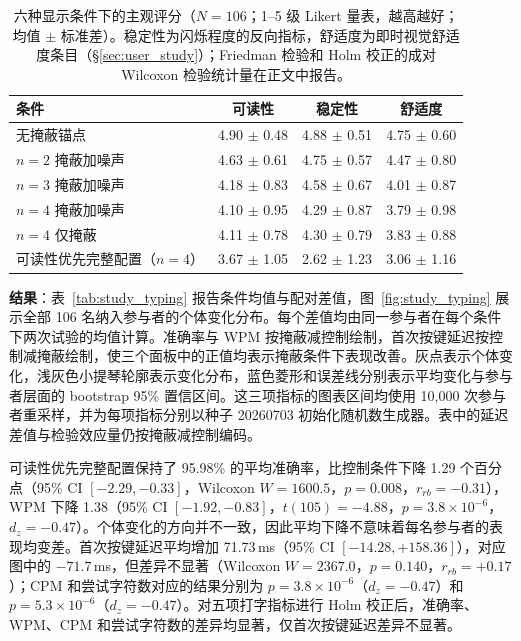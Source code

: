 \documentclass{ieeeaccess}
\begin{document}
{\begin{table}[!t]
\caption{六种显示条件下的主观评分（$N=106$；1--5 级 Likert 量表，越高越好；均值 $\pm$ 标准差）。稳定性为闪烁程度的反向指标，舒适度为即时视觉舒适度条目（\S\ref{sec:user_study}）；Friedman 检验和 Holm 校正的成对 Wilcoxon 检验统计量在正文中报告。}
\label{tab:study_ratings}
\centering
\footnotesize
\setlength{\tabcolsep}{4pt}
\begin{tabular}{lccc}
\toprule
条件 & 可读性 & 稳定性 & 舒适度 \\
\midrule
无掩蔽锚点 & 4.90 $\pm$ 0.48 & 4.88 $\pm$ 0.51 & 4.75 $\pm$ 0.60 \\
$n{=}2$ 掩蔽加噪声 & 4.63 $\pm$ 0.61 & 4.75 $\pm$ 0.57 & 4.47 $\pm$ 0.80 \\
$n{=}3$ 掩蔽加噪声 & 4.18 $\pm$ 0.83 & 4.58 $\pm$ 0.67 & 4.01 $\pm$ 0.87 \\
$n{=}4$ 掩蔽加噪声 & 4.10 $\pm$ 0.95 & 4.29 $\pm$ 0.87 & 3.79 $\pm$ 0.98 \\
$n{=}4$ 仅掩蔽 & 4.11 $\pm$ 0.78 & 4.30 $\pm$ 0.79 & 3.83 $\pm$ 0.88 \\
可读性优先完整配置（$n{=}4$） & 3.67 $\pm$ 1.05 & 2.62 $\pm$ 1.23 & 3.06 $\pm$ 1.16 \\
\bottomrule
\end{tabular}
\end{table}

\textbf{结果}：表~\ref{tab:study_typing} 报告条件均值与配对差值，图~\ref{fig:study_typing} 展示全部 106 名纳入参与者的个体变化分布。每个差值均由同一参与者在每个条件下两次试验的均值计算。准确率与 WPM 按掩蔽减控制绘制，首次按键延迟按控制减掩蔽绘制，使三个面板中的正值均表示掩蔽条件下表现改善。灰点表示个体变化，浅灰色小提琴轮廓表示变化分布，蓝色菱形和误差线分别表示平均变化与参与者层面的 bootstrap 95\% 置信区间。这三项指标的图表区间均使用 10,000 次参与者重采样，并为每项指标分别以种子 20260703 初始化随机数生成器。表中的延迟差值与检验效应量仍按掩蔽减控制编码。

可读性优先完整配置保持了 95.98\% 的平均准确率，比控制条件下降 1.29 个百分点（95\% CI $[-2.29,-0.33]$，Wilcoxon $W=1600.5$，$p=0.008$，$r_{rb}=-0.31$），WPM 下降 1.38（95\% CI $[-1.92,-0.83]$，$t(105)=-4.88$，$p=3.8\times10^{-6}$，$d_z=-0.47$）。个体变化的方向并不一致，因此平均下降不意味着每名参与者的表现均变差。首次按键延迟平均增加 71.73\,ms（95\% CI $[-14.28,+158.36]$），对应图中的 $-71.7$\,ms，但差异不显著（Wilcoxon $W=2367.0$，$p=0.140$，$r_{rb}=+0.17$）；CPM 和尝试字符数对应的结果分别为 $p=3.8\times10^{-6}$（$d_z=-0.47$）和 $p=5.3\times10^{-6}$（$d_z=-0.47$）。对五项打字指标进行 Holm 校正后，准确率、WPM、CPM 和尝试字符数的差异均显著，仅首次按键延迟差异不显著。

}
\end{document}
